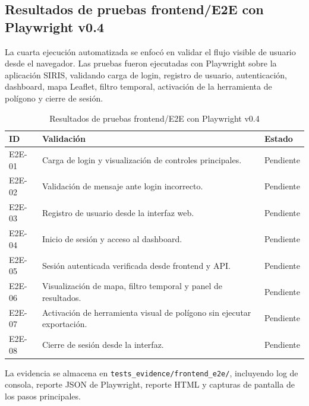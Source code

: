 
\subsection{Resultados de pruebas frontend/E2E con Playwright v0.4}

La cuarta ejecución automatizada se enfocó en validar el flujo visible de usuario desde
el navegador. Las pruebas fueron ejecutadas con Playwright sobre la aplicación SIRIS,
validando carga de login, registro de usuario, autenticación, dashboard, mapa Leaflet,
filtro temporal, activación de la herramienta de polígono y cierre de sesión.

\begin{table}[H]
\centering
\begin{tabular}{|p{2.5cm}|p{8.3cm}|p{2.3cm}|}
\hline
\textbf{ID} & \textbf{Validación} & \textbf{Estado} \\
\hline
E2E-01 & Carga de login y visualización de controles principales. & Pendiente \\
\hline
E2E-02 & Validación de mensaje ante login incorrecto. & Pendiente \\
\hline
E2E-03 & Registro de usuario desde la interfaz web. & Pendiente \\
\hline
E2E-04 & Inicio de sesión y acceso al dashboard. & Pendiente \\
\hline
E2E-05 & Sesión autenticada verificada desde frontend y API. & Pendiente \\
\hline
E2E-06 & Visualización de mapa, filtro temporal y panel de resultados. & Pendiente \\
\hline
E2E-07 & Activación de herramienta visual de polígono sin ejecutar exportación. & Pendiente \\
\hline
E2E-08 & Cierre de sesión desde la interfaz. & Pendiente \\
\hline
\end{tabular}
\caption{Resultados de pruebas frontend/E2E con Playwright v0.4}
\end{table}

La evidencia se almacena en \texttt{tests\_evidence/frontend\_e2e/}, incluyendo log de
consola, reporte JSON de Playwright, reporte HTML y capturas de pantalla de los pasos
principales.
